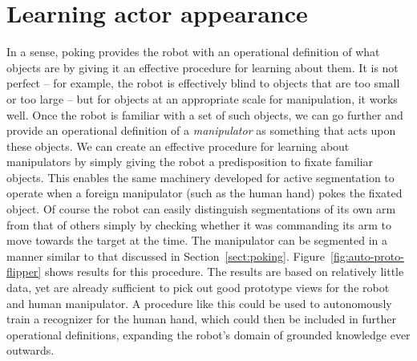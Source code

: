 
\section{Learning actor appearance}


In a sense, poking provides the robot with an operational definition
of what objects are
by giving it an
effective procedure for learning about them.  It is not perfect -- for
example, the robot is effectively blind to objects that are too small
or too large -- but for objects at an appropriate scale for
manipulation, it works well.
Once the robot is familiar with a set of such objects,
we can go further and provide an operational definition of a {\em
manipulator} as something that acts upon these objects.  We can create
an effective procedure for learning about manipulators by simply
giving the robot a predisposition to fixate familiar objects.  This
enables the same machinery developed for active segmentation to
operate when a foreign manipulator (such as the human hand) pokes the
fixated object.  Of course the robot can easily distinguish
segmentations of its own arm from that of others simply by checking
whether it was commanding its arm to move towards the target at the
time.  The manipulator can be segmented in a manner similar to 
that discussed in Section~\ref{sect:poking}.
Figure~\ref{fig:auto-proto-flipper}
shows results for this procedure.  The results are based on
relatively little data, yet are already
sufficient to pick out good prototype views for the robot and human
manipulator.
A procedure like this could be used to autonomously
train a recognizer for the human hand, which could then
be included in further operational definitions, expanding
the robot's domain of grounded knowledge ever outwards.

